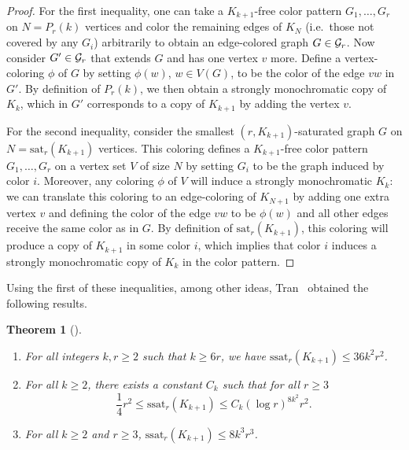 \documentclass[12pt]{article}
\newcommand{\cG}{{\cal G}}
\newtheorem{theorem}{Theorem}
\theoremstyle{definition}
\begin{document}
	\begin{proof}
		For the first inequality, one can take a $K_{k+1}$-free color pattern $G_1,\dots,G_r$ on $N = P_r(k)$ vertices and color the remaining edges of $K_N$ (i.e.\ those not covered by any $G_i$) arbitrarily to obtain an edge-colored graph $G \in \cG_r$. Now consider $G' \in \cG_r$ that extends $G$ and has one vertex $v$ more. Define a vertex-coloring $\phi$ of $G$ by setting $\phi(w)$, $w \in V(G)$, to be the color of the edge $vw$ in $G'$. By definition of $P_r(k)$, we then obtain a strongly monochromatic copy of $K_k$, which in $G'$ corresponds to a copy of $K_{k+1}$ by adding the vertex $v$. 
		
		For the second inequality, consider the smallest $(r,K_{k+1})$-saturated graph $G$ on $N = \mathrm{sat}_r(K_{k+1})$ vertices. This coloring defines a $K_{k+1}$-free color pattern $G_1,\dots,G_r$ on a vertex set $V$ of size $N$ by setting $G_i$ to be the graph induced by color $i$. Moreover, any coloring $\phi$ of $V$ will induce a strongly monochromatic $K_k$: we can translate this coloring to an edge-coloring of $K_{N+1}$ by adding one extra vertex $v$ and defining the color of the edge $vw$ to be $\phi(w)$ and all other edges receive the same color as in $G$. By definition of $\mathrm{sat}_r(K_{k+1})$, this coloring will produce a copy of $K_{k+1}$ in some color $i$, which implies that color $i$ induces a strongly monochromatic copy of $K_k$ in the color pattern.
	\end{proof}
	
	Using the first of these inequalities, among other ideas, Tran~\cite{tran2022two} obtained the following results.
	
	\begin{theorem}[\cite{tran2022two}]
		\mbox{ }
		\begin{enumerate}
			\item For all integers $k,r \geq 2$ such that $k \geq 6r$, we have $\mathrm{ssat}_r(K_{k+1}) \leq 36k^2r^2$.
			
			\item For all $k \geq 2$, there exists a constant $C_k$ such that for all $r \geq 3$
			\[\frac{1}{4}r^2 \leq \mathrm{ssat}_r(K_{k+1}) \leq C_k(\log r)^{8k^2}r^2.\]
			
			\item For all $k \geq 2$ and $r \geq 3$, $\mathrm{ssat}_r(K_{k+1}) \leq 8k^3r^3$.
		\end{enumerate}	
	\end{theorem}
	
\end{document}
